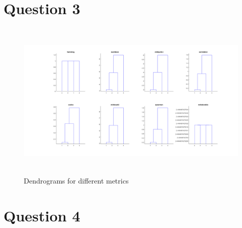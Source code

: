 \documentclass[11pt]{extarticle}
\begin{document}
\section{Question 3}

\begin{center}
    \begin{figure}[h]
        \includegraphics[width = 7in, height = 3in]{Q3.png}
        \caption{Dendrograms for different metrics}
        \label{fig:q3fig}
    \end{figure}
\end{center}


\pagebreak

\section{Question 4}
\end{document}

